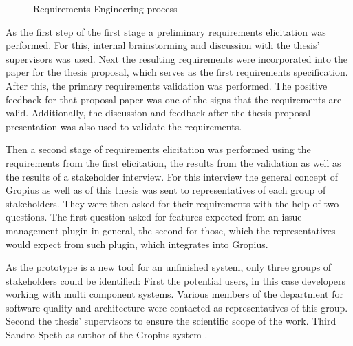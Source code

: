\begin{figure}[!h]
	\caption{Requirements Engineering process}
	\label{fig:requirmentsProcess}
\end{figure}

As the first step of the first stage a preliminary requirements elicitation was performed. 
For this, internal brainstorming and discussion with the thesis' supervisors was used.
Next the resulting requirements were incorporated into the paper for the thesis proposal, 
which serves as the first requirements specification.
After this, the primary requirements validation was performed. 
The positive feedback for that proposal paper was one of the signs that the requirements are valid.
Additionally, the discussion and feedback after the thesis proposal presentation was also used to validate the requirements.

Then a second stage of requirements elicitation was performed using the requirements from the first elicitation, 
the results from the validation as well as the results of a stakeholder interview.
For this interview the general concept of Gropius as well as of this thesis was sent to representatives of each group of stakeholders. 
They were then asked for their requirements with the help of two questions.
The first question asked for features expected from an issue management plugin in general,
the second for those, which the representatives would expect from such plugin, which integrates into Gropius.

As the prototype is a new tool for an unfinished system, only three groups of stakeholders could be identified:
First the potential users, in this case developers working with multi component systems.
Various members of the department for software quality and architecture were contacted as representatives of this group.
Second the thesis' supervisors to ensure the scientific scope of the work. 
Third Sandro Speth as author of the Gropius system \cite{speth2020gropius}.


